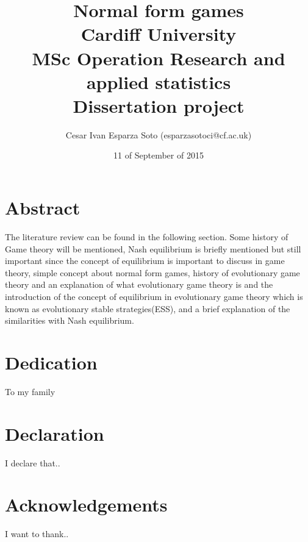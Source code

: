 \documentclass{book}
\begin{document}
\thispagestyle{empty}
\title{
{Normal form games}\\
{Cardiff University}\\
{MSc Operation Research and applied statistics}\\
{Dissertation project}\\
}

\author{Cesar Ivan Esparza Soto (esparzasotoci@cf.ac.uk)}
\date{11 of September of 2015}
\maketitle

\chapter*{Abstract}
The literature review can be found in the following section. Some history of Game theory will be mentioned, Nash equilibrium is briefly mentioned but still important since the concept of equilibrium is important to discuss in game theory, simple concept about normal form games, history of evolutionary game theory and an explanation of what evolutionary game theory is and the introduction of the concept of equilibrium in evolutionary game theory which is known as evolutionary stable strategies(ESS), and a brief explanation of the similarities with Nash equilibrium.

\chapter*{Dedication}
To my family

\chapter*{Declaration}
I declare that..

\chapter*{Acknowledgements}
I want to thank..



\newpage
\thispagestyle{empty}
\tableofcontents

\newpage
\thispagestyle{empty}
\listoftables

\newpage
\thispagestyle{empty}
\listoffigures

\newpage
\maketitle
 
\end{document}
